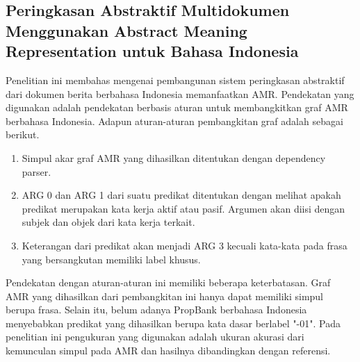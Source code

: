 \subsection{Peringkasan Abstraktif Multidokumen Menggunakan Abstract Meaning Representation untuk Bahasa Indonesia }

Penelitian ini membahas mengenai pembangunan sistem peringkasan abstraktif dari dokumen berita berbahasa Indonesia memanfaatkan AMR.
Pendekatan yang digunakan adalah pendekatan berbasis aturan untuk membangkitkan graf AMR berbahasa Indonesia.
Adapun aturan-aturan pembangkitan graf adalah sebagai berikut.

\begin{enumerate}
  \item Simpul akar graf AMR yang dihasilkan ditentukan dengan dependency parser.
  \item ARG 0 dan ARG 1 dari suatu predikat ditentukan dengan melihat apakah predikat merupakan kata kerja aktif atau pasif.
  Argumen akan diisi dengan subjek dan objek dari kata kerja terkait.
  \item Keterangan dari predikat akan menjadi ARG 3 kecuali kata-kata pada frasa yang bersangkutan memiliki label khusus.
\end{enumerate}

Pendekatan dengan aturan-aturan ini memiliki beberapa keterbatasan.
Graf AMR yang dihasilkan dari pembangkitan ini hanya dapat memiliki simpul berupa frasa.
Selain itu, belum adanya PropBank berbahasa Indonesia menyebabkan predikat yang dihasilkan berupa kata dasar berlabel "-01".
Pada penelitian ini pengukuran yang digunakan adalah ukuran akurasi dari kemunculan simpul pada AMR dan hasilnya dibandingkan dengan referensi.
